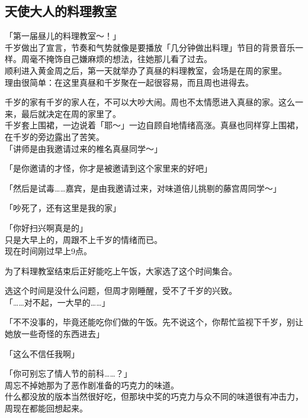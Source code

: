 \subsection{天使大人的料理教室}

「第一届昼儿的料理教室～！」\\

千岁做出了宣言，节奏和气势就像是要播放「几分钟做出料理」节目的背景音乐一样。周毫不掩饰自己嫌麻烦的想法，往她那儿看了过去。\\

顺利进入黄金周之后，第一天就举办了真昼的料理教室，会场是在周的家里。\\

理由很简单：在这里真昼和千岁聚在一起很容易，而且周也进得去。

千岁的家有千岁的家人在，不可以大吵大闹。周也不太情愿进入真昼的家。这么一来，最后就决定在周的家里了。\\

千岁套上围裙，一边说着「耶～」一边自顾自地情绪高涨。真昼也同样穿上围裙，在千岁的旁边露出了苦笑。\\

「讲师是由我邀请过来的椎名真昼同学～」

「是你邀请的才怪，你才是被邀请到这个家里来的好吧」

「然后是试毒……嘉宾，是由我邀请过来，对味道倍儿挑剔的藤宫周同学～」

「吵死了，还有这里是我的家」

「你好扫兴啊真是的」\\

只是大早上的，周跟不上千岁的情绪而已。\\

现在时间刚过早上9点。

为了料理教室结束后正好能吃上午饭，大家选了这个时间集合。

选这个时间是没什么问题，但周才刚睡醒，受不了千岁的兴致。\\

「……对不起，一大早的……」

「不不没事的，毕竟还能吃你们做的午饭。先不说这个，你帮忙监视下千岁，别让她放一些奇怪的东西进去」

「这么不信任我啊」

「你可别忘了情人节的前科……？」\\

周忘不掉她那为了恶作剧准备的巧克力的味道。\\

什么都没放的版本当然很好吃，但那块中奖的巧克力与众不同的味道很有冲击力，周现在都能回想起来。

